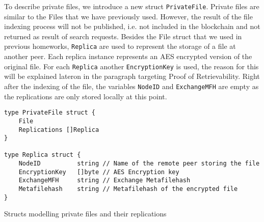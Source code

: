 \documentclass{article}
\begin{document}

To describe private files, we introduce a new struct \texttt{PrivateFile}. Private files are similar to the Files that we have previously used. However, the result of the file indexing process will not be published, i.e. not included in the blockchain and not returned as result of search requests. 
Besides the File struct that we used in previous homeworks, \texttt{Replica} are used to represent the storage of a file at another peer. Each replica instance represents an AES encrypted version of the original file. For each \texttt{Replica} another \texttt{EncryptionKey} is used, the reason for this will be explained lateron in the paragraph targeting Proof of Retrievability. Right after the indexing of the file, the variables \texttt{NodeID} and \texttt{ExchangeMFH} are empty as the replications are only stored locally at this point. \\\vspace{0.5em}

\begin{listing}
\begin{verbatim}
type PrivateFile struct {
	File
	Replications []Replica
}

type Replica struct {
	NodeID          string // Name of the remote peer storing the file
	EncryptionKey   []byte // AES Encryption key
	ExchangeMFH     string // Exchange Metafilehash
	Metafilehash    string // Metafilehash of the encrypted file
}
\end{verbatim}
\caption{Structs modelling private files and their replications}
\end{listing}
\end{document}
